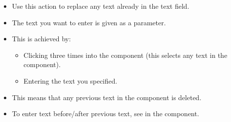\begin{itemize}
\item Use this action to replace any text already in the text field.
\item The text you want to enter is given as a parameter.
\item This is achieved by:
\begin{itemize}
\item Clicking three times into the component (this selects any text in the component).
\item Entering the text you specified.
\end{itemize}
\item This means that any previous text in the component is deleted. 
\item To enter text before/after previous text, see  in the  component.
\end{itemize}
 